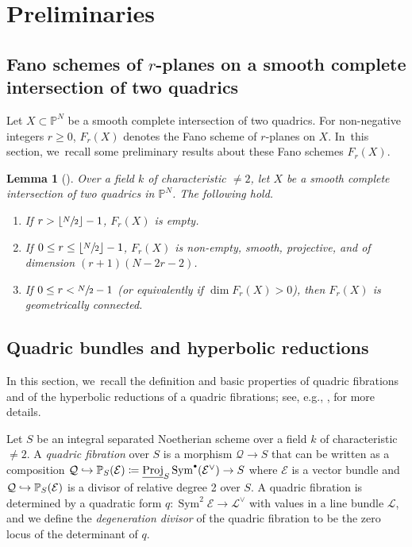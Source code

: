 \documentclass[10pt,a4paper]{amsart}
\newcommand{\Subsection}{\subsection}
\newcommand\hto{\mathrel{\lhook\joinrel\to}}
\newcommand{\sbullet}{{\scriptscriptstyle\bullet}}
\newcommand{\csbullet}{{\raisebox{1pt}{$\sbullet$}}}
\let\cal\mathcal
\let\bb\mathbb\let\Bbb\mathbb
\theoremstyle{plain}
\newtheorem{lem}[thm]{Lemma}
\theoremstyle{definition}
\DeclareMathOperator{\Proj}{Proj}
\DeclareMathOperator{\Sym}{Sym}
\newcommand{\defi}[1]{\emph{#1}}
\renewcommand\P{\mathbb{P}}
\begin{document}
\section{Preliminaries}\label{sec:background}

\Subsection{Fano schemes of $r$-planes on a smooth complete intersection of two quadrics}

Let \(X\subset\bb P^N\) be a smooth complete intersection of two quadrics. For non-negative integers $r\geq 0$, $F_r(X)$ denotes the Fano scheme of $r$-planes on $X$. In~this section, we~recall some preliminary results about these Fano schemes \(F_r(X)\).

\begin{lem}[{\cite[Lem.\,A.3 \& A.4]{CT-intersection-quadrics}}]\label{lem:Kuznetsov_fanoscheme}
Over a field \(k\) of characteristic \(\neq 2\), let $X$ be a smooth complete intersection of two quadrics in $\P^{N}$. The following hold.
\begin{enumerate}
\item
If $r>\lfloor\sfrac{N}{2}\rfloor -1$,
$F_r(X)$ is empty.
\item
If $0\leq r\leq \lfloor\sfrac{N}{2}\rfloor -1$,
$F_r(X)$ is non-empty, smooth, projective, and of dimension $(r+1)(N-2r-2)$.
\item If $0\leq r< \sfrac{N}{2} -1$ (or equivalently if $\dim F_r(X)>0$), then $F_r(X)$ is geometrically connected.
\end{enumerate}
\end{lem}

\setcounter{thm}{2}
\subsection{Quadric bundles and hyperbolic reductions}\label{subsection:hyperbolic-reduction}

In this section, we~recall the definition and basic properties of quadric fibrations and of the hyperbolic reductions of a quadric fibrations; see, e.g., \cite[\S 2]{Kuznetsov-hyperbolic}, \cite[\S 1.3]{ABB14} for more details.

Let \(S\) be an integral separated Noetherian scheme over a field \(k\) of characteristic \(\neq 2\). A \defi{quadric fibration} over \(S\) is a morphism \(\cal Q\to S\) that can be written as a composition \(\cal Q\hto\bb P_S(\cal E) \coloneqq \underline{\Proj}_S \Sym^\csbullet (\cal E^\vee) \to S\)
where \(\cal E\) is a vector bundle and \(\cal Q\hto\bb P_S(\cal E)\) is a divisor of relative degree 2 over \(S\). A quadric fibration is determined by a quadratic form \(q\colon\Sym^2\cal E\to\cal L^\vee\) with values in a line bundle \(\cal L\), and we define the \defi{degeneration divisor} of the quadric fibration to be the zero locus of the determinant of $q$.
\end{document}

